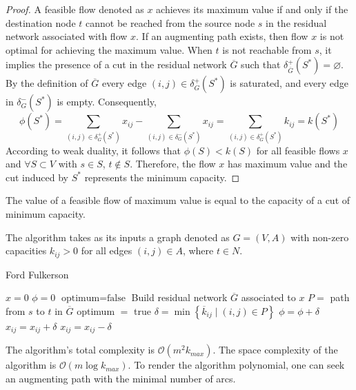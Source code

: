 \begin{proof}
    A feasible flow denoted as $x$  achieves its maximum value if and only if the destination node $t$ cannot be reached from the source node $s$ in the residual network associated with flow $x$. 
    If an augmenting path exists, then flow $x$ is not optimal for achieving the maximum value.
    When $t$ is not reachable from $s$, it implies the presence of a cut in the residual network $\overline{G}$ such that $\delta^{+}_{\overline{G}}(S^{\ast})=\varnothing$. 
    By the definition of $\overline{G}$  every edge $(i,j) \in \delta^{+}_{G}(S^{\ast})$ is saturated, and every edge in $\delta^{-}_{G}(S^{\ast})$ is empty. 
    Consequently,
    \[\phi(S^{\ast})=\sum_{(i,j) \in \delta^{+}_{G}(S^{\ast})}{x_{ij}}-\sum_{(i,j) \in \delta^{-}_{G}(S^{\ast})}{x_{ij}}= \sum_{(i,j) \in \delta^{+}_{G}(S^{\ast})}{k_{ij}}=k(S^{\ast})\]
    According to weak duality, it follows that $\phi(S) < k(S)$ for all feasible flows $x$ and $\forall S \subset V$ with $s \in S$, $t \notin S$. 
    Therefore, the flow $x$ has maximum value and the cut induced by $S^{\ast}$ represents the minimum capacity.
\end{proof}
\begin{theorem}
    The value of a feasible flow of maximum value is equal to the capacity of a cut of minimum capacity.
\end{theorem}

The algorithm takes as its inputs a graph denoted as $G=(V,A)$ with non-zero capacities $k_{ij}>0$ for all edges $(i,j) \in A$, where $t \in N$. 
\begin{algorithm}[H]
    \caption{Ford Fulkerson}
        \begin{algorithmic}[1]
            \State $x = 0$
            \State $\phi = 0$
            \State $\text{optimum} = \text{false}$
                \State Build residual network $\overline{G}$ associated to $x$
                \State $P =$ path from $s$ to $t$ in $\overline{G}$
                    \State optimum $=$ true
                \Else
                    \State $\delta = \min\left\{\overline{k}_{ij}\mid (i,j) \in P\right\}$
                    \State $\phi = \phi + \delta$
                            \State $x_{ij} = x_{ij}+\delta$
                        \Else 
                            \State $x_{ij} = x_{ij}-\delta$
                        \EndIf
                    \EndFor
                \EndIf
            \EndWhile
        \end{algorithmic}
\end{algorithm}
The algorithm's total complexity is $\mathcal{O}(m^2k_{max})$. 
The space complexity of the algorithm is $\mathcal{O}(m\log{k_{max}})$. 
To render the algorithm polynomial, one can seek an augmenting path with the minimal number of arcs.

